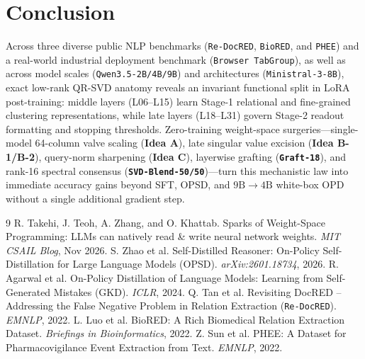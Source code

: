 \documentclass[11pt,a4paper]{article}
\begin{document}
\section{Conclusion}
Across three diverse public NLP benchmarks (\texttt{Re-DocRED}, \texttt{BioRED}, and \texttt{PHEE}) and a real-world industrial deployment benchmark (\texttt{Browser TabGroup}), as well as across model scales (\texttt{Qwen3.5-2B/4B/9B}) and architectures (\texttt{Ministral-3-8B}), exact low-rank QR-SVD anatomy reveals an invariant functional split in LoRA post-training: middle layers (L06--L15) learn Stage-1 relational and fine-grained clustering representations, while late layers (L18--L31) govern Stage-2 readout formatting and stopping thresholds. Zero-training weight-space surgeries—single-model 64-column valve scaling (\textbf{Idea A}), late singular value excision (\textbf{Idea B-1/B-2}), query-norm sharpening (\textbf{Idea C}), layerwise grafting (\textbf{\texttt{Graft-18}}), and rank-16 spectral consensus (\textbf{\texttt{SVD-Blend-50/50}})—turn this mechanistic law into immediate accuracy gains beyond SFT, OPSD, and $9\text{B}\to 4\text{B}$ white-box OPD without a single additional gradient step.

\begin{thebibliography}{9}
 R. Takehi, J. Teoh, A. Zhang, and O. Khattab. Sparks of Weight-Space Programming: LLMs can natively read \& write neural network weights. \emph{MIT CSAIL Blog}, Nov 2026.
 S. Zhao et al. Self-Distilled Reasoner: On-Policy Self-Distillation for Large Language Models (OPSD). \emph{arXiv:2601.18734}, 2026.
 R. Agarwal et al. On-Policy Distillation of Language Models: Learning from Self-Generated Mistakes (GKD). \emph{ICLR}, 2024.
 Q. Tan et al. Revisiting DocRED -- Addressing the False Negative Problem in Relation Extraction (\texttt{Re-DocRED}). \emph{EMNLP}, 2022.
 L. Luo et al. BioRED: A Rich Biomedical Relation Extraction Dataset. \emph{Briefings in Bioinformatics}, 2022.
 Z. Sun et al. PHEE: A Dataset for Pharmacovigilance Event Extraction from Text. \emph{EMNLP}, 2022.
\end{thebibliography}
\end{document}
